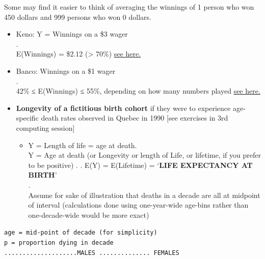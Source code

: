 \documentclass[]{book}
\providecommand{\tightlist}{%
  \setlength{\itemsep}{0pt}\setlength{\parskip}{0pt}}
\begin{document}
Some may find it easier to think of averaging the winnings of 1 person who won 450 dollars and 999 persons who won 0 dollars.

\begin{itemize}
\item
  Keno: Y = Winnings on a \$3 wager\\
  .\\
  E(Winnings) = \$2.12 (\textgreater{} 70\%) \href{http://www.medicine.mcgill.ca/epidemiology/hanley/c323/lotteries/Keno(20-spot).pdf}{see here.}
\item
  Banco: Winnings on a \$1 wager\\
  .\\
  42\% ≤ E(Winnings) ≤ 55\%, depending on how many numbers played \href{http://www.medicine.mcgill.ca/epidemiology/hanley/c323/lotteries/banco.pdf}{see here.}
\item
  \textbf{Longevity of a fictitious birth cohort} if they were to experience age-specific death rates observed in Quebec in 1990 {[}see exercises in 3rd computing session{]}

  \begin{itemize}
  \tightlist
  \item
    Y = Length of life = age at death.\\
    Y = Age at death (or Longevity or length of Life, or lifetime, if you prefer to be positive) .
    .
    E(Y) = E(Lifetime) = `\textbf{LIFE EXPECTANCY AT BIRTH}'\\
    .\\
    Assume for sake of illustration that deaths in a decade are all at midpoint of interval (calculations done using one-year-wide age-bins rather than one-decade-wide would be more exact)
  \end{itemize}
\end{itemize}

\texttt{age\ =\ mid-point\ of\ decade\ (for\ simplicity)}\\
\texttt{p\ =\ proportion\ dying\ in\ decade}~\\
\texttt{....................MALES\ ..............\ FEMALES}
\end{document}
